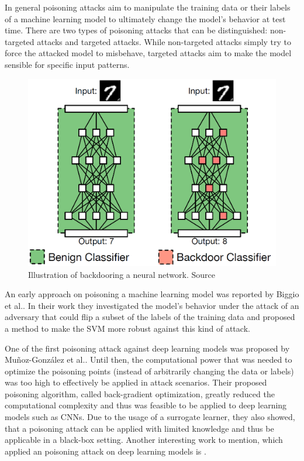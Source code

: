 \documentclass[sigconf]{acmart}
\begin{document}
In general poisoning attacks aim to manipulate the training data or their labels of a machine learning model to ultimately change the model's behavior at test time.
There are two types of poisoning attacks that can be distinguished: non-targeted attacks and targeted attacks.
While non-targeted attacks simply try to force the attacked model to misbehave, targeted attacks aim to make the model sensible for specific input patterns.

\begin{figure}[h]
  \centering
  \includegraphics[width=\linewidth]{img/badnet.png}
  \caption{Illustration of backdooring a neural network. Source \cite{8685687}}
\end{figure}

An early approach on poisoning a machine learning model was reported by Biggio et al.\cite{svmPoison}.
In their work they investigated the model's behavior under the attack of an adversary that could flip a subset of the labels of the training data and proposed a method to make the SVM more robust against this kind of attack.

One of the first poisoning attack against deep learning models was proposed by Muñoz-González et al.\cite{DBLP:journals/corr/abs-1708-08689}.
Until then, the computational power that was needed to optimize the poisoning points (instead of arbitrarily changing the data or labels) was too high to effectively be applied in attack scenarios.
Their proposed poisoning algorithm, called back-gradient optimization, greatly reduced the computational complexity and thus was feasible to be applied to deep learning models such as CNNs. 
Due to the usage of a surrogate learner, they also showed, that a poisoning attack can be applied with limited knowledge and thus be applicable in a black-box setting.
Another interesting work to mention, which applied an poisoning attack on deep learning models is \cite{koh2017understanding}.
\end{document}
